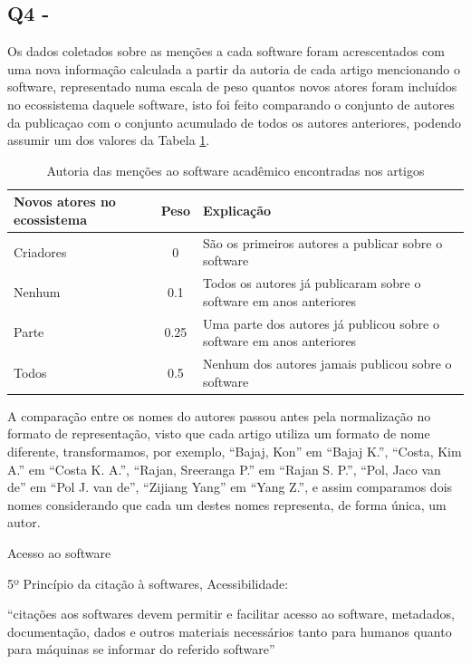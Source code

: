 \subsection{Q4 - \QuestaoQuatro}

Os dados coletados sobre as menções a cada software foram acrescentados com uma
nova informação calculada a partir da autoria de cada artigo mencionando o
software, representado numa escala de peso quantos novos atores foram incluídos
no ecossistema daquele software, isto foi feito comparando o conjunto de autores
da publicaçao com o conjunto acumulado de todos os autores anteriores, 
podendo assumir um dos valores da Tabela \ref{coding-scheme-author}.


\begin{table}[h]
\caption{Autoria das menções ao software acadêmico encontradas nos artigos}
\centering
\begin{tabular}{ l c p{10cm} }
  \hline
  Novos atores no ecossistema & Peso & Explicação \\
  \hline
  Criadores & 0 & São os primeiros autores a publicar sobre o software \\
  Nenhum    & 0.1 & Todos os autores já publicaram sobre o software em anos anteriores \\
  Parte     & 0.25 & Uma parte dos autores já publicou sobre o software em anos anteriores \\
  Todos     & 0.5 & Nenhum dos autores jamais publicou sobre o software \\
  \hline
\end{tabular}
\label{coding-scheme-author}
\end{table}

A comparação entre os nomes do autores passou antes pela normalização
no formato de representação, visto que cada artigo utiliza um formato
de nome diferente, transformamos, por exemplo, ``Bajaj, Kon'' em ``Bajaj K.'',
``Costa, Kim A.'' em ``Costa K. A.'', ``Rajan, Sreeranga P.'' em ``Rajan S. P.'',
``Pol, Jaco van de'' em ``Pol J. van de'', ``Zijiang Yang'' em ``Yang Z.'',
e assim comparamos dois nomes considerando que cada um destes nomes representa,
de forma única, um autor.

Acesso ao software

5º Princípio da citação à softwares, Acessibilidade:

``citações aos softwares devem permitir e facilitar acesso ao software,
metadados, documentação, dados e outros materiais necessários tanto
para humanos quanto para máquinas se informar do referido software''

